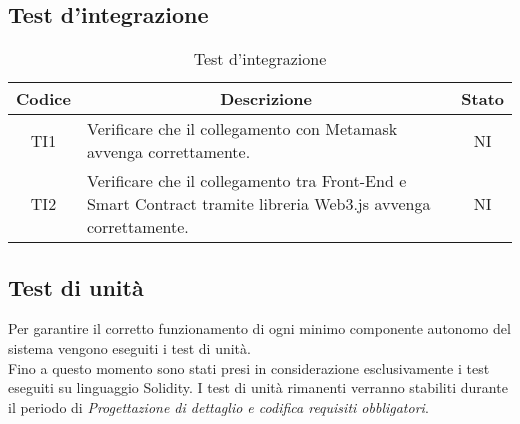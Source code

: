 \subsection{Test d'integrazione}\label{subsection:test_integrazione}
\begin{table}[H]
  \centering
  \renewcommand{\arraystretch}{1.8}
  \begin{tabular}{c|p{8cm}|c}
    \rowcolor[HTML]{125E28}
    \color[HTML]{FFFFFF}\textbf{Codice}
        & \multicolumn{1}{c}{\color[HTML]{FFFFFF}\textbf{Descrizione}}
        & \color[HTML]{FFFFFF}\textbf{Stato}                                                                                       \\
    \hline
    TI1 & Verificare che il collegamento con Metamask avvenga correttamente.                                                  & NI \\
    TI2 & Verificare che il collegamento tra Front-End\glo{} e Smart Contract tramite libreria Web3.js avvenga correttamente. & NI \\
  \end{tabular}
  \caption{Test d'integrazione}
\end{table}

\vspace{1cm}
\subsection{Test di unità}\label{subsection:test_unita}
Per garantire il corretto funzionamento di ogni minimo componente autonomo del sistema vengono eseguiti i test di unità. \\
Fino a questo momento sono stati presi in considerazione esclusivamente i test eseguiti su linguaggio Solidity\glo{}.
I test di unità rimanenti verranno stabiliti durante il periodo di \textit{Progettazione di dettaglio e codifica requisiti obbligatori}.

